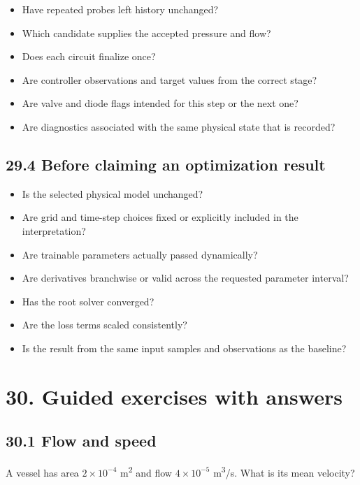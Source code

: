 \documentclass[11pt,a4paper]{article}
\begin{document}
\begin{itemize}
\item Have repeated probes left history unchanged?


\item Which candidate supplies the accepted pressure and flow?


\item Does each circuit finalize once?


\item Are controller observations and target values from the correct stage?


\item Are valve and diode flags intended for this step or the next one?


\item Are diagnostics associated with the same physical state that is recorded?


\end{itemize}
\subsection{29.4 Before claiming an optimization result}

\begin{itemize}
\item Is the selected physical model unchanged?


\item Are grid and time-step choices fixed or explicitly included in the interpretation?


\item Are trainable parameters actually passed dynamically?


\item Are derivatives branchwise or valid across the requested parameter interval?


\item Has the root solver converged?


\item Are the loss terms scaled consistently?


\item Is the result from the same input samples and observations as the baseline?


\end{itemize}
\clearpage
\section{30. Guided exercises with answers}
\subsection{30.1 Flow and speed}
A vessel has area \(2\times10^{-4}\) m\textsuperscript{2} and flow \(4\times10^{-5}\) m\textsuperscript{3}/s. What is its mean velocity?
\end{document}
